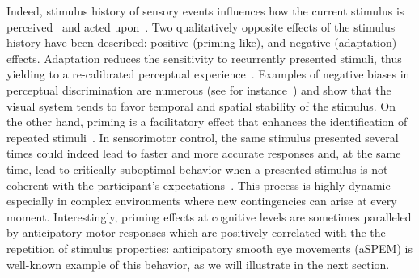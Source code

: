 \documentclass[12pt,english]{article}%
\newcommand{\citep}[1]{\parencite{#1}}
\newcommand{\citet}[1]{\textcite{#1}}
\newcommand{\AM}[1]{\textbf{\textcolor{blue}{[AM: #1]}}}
\begin{document}
Indeed, stimulus history of sensory events influences
how the current stimulus is perceived~\citep{Sotiropoulos2011,Adams12,ChopinMamassian2012,FischerWhitney2014,Cicchini_PRSB_2018} and 
acted upon~\citep{WallmanFuchs1998,Carpenter1995, Maus2015,Damasse18}.
Two qualitatively opposite effects of the stimulus history have been described: positive (priming-like), and negative (adaptation) effects. 
Adaptation reduces the sensitivity to recurrently presented stimuli,
thus yielding to a re-calibrated perceptual experience~\citep{Clifford2007, Webster2011, Kohn2007}. Examples of negative biases in perceptual discrimination are numerous (see for instance~\citet{KanaiVerstraten2005,ChopinMamassian2012}) and show that the visual system tends
to favor temporal and spatial stability of the stimulus.
On the other hand, priming is a facilitatory effect that
enhances the identification of repeated stimuli~\citep{Verstraten1994, Tiest2009}. 
In sensorimotor control,
the same stimulus presented several times could indeed
lead to faster and more accurate responses and,
at the same time, lead to critically suboptimal behavior
when a presented stimulus is not coherent
with the participant's expectations~\citep{Hyman1953, Yu2009}. This process is highly dynamic especially in complex environments
where new contingencies can arise at every moment.
Interestingly, priming effects at cognitive levels
are sometimes paralleled by anticipatory motor responses which are positively correlated with the the repetition of stimulus properties: anticipatory smooth eye movements (aSPEM) is well-known example of this behavior, as we will illustrate in the next section.
\end{document}
